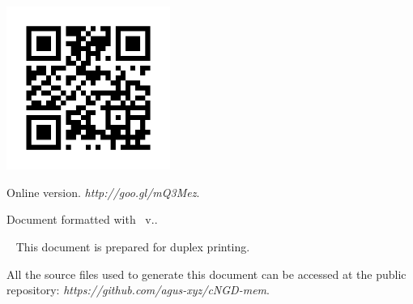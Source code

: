 
\newpage
\thispagestyle{empty}
\mbox{ }

\begin{center}
\includegraphics[width=0.4\textwidth]{Imagenes/Bitmap/Otras/memoriaonline}
\end{center}

\begin{small}
\begin{center}
Online version. \emph{http://goo.gl/mQ3Mez}.
\end{center}
\end{small}


\vfill%
\begin{small} 
\begin{center}
\ifx\noTeXiSCreditsVal\undefined
  Document formatted with \texis\ v.\texisVer.
\else
\mbox{ }
\fi
\end{center}
\end{small}
\vspace*{1cm}
\begin{small} 
\begin{center}
\ifx\explicacionDobleCaraVal\undefined
\mbox{ }
\else
\noindent This document is prepared for duplex printing.
\fi
\end{center}
\end{small}

\begin{small}
\begin{center}
\vspace*{1cm}
All the source files used to generate this document can be accessed at the public repository: \emph{https://github.com/agus-xyz/cNGD-mem}.
\end{center}
\end{small}

